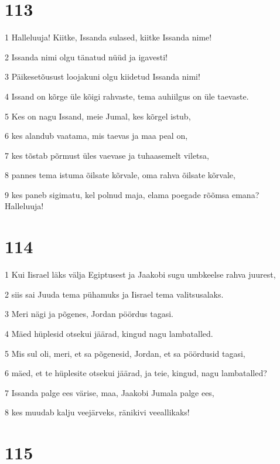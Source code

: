 \chapter{113}

\par 1 Halleluuja! Kiitke, Issanda sulased, kiitke Issanda nime!
\par 2 Issanda nimi olgu tänatud nüüd ja igavesti!
\par 3 Päikesetõusust loojakuni olgu kiidetud Issanda nimi!
\par 4 Issand on kõrge üle kõigi rahvaste, tema auhiilgus on üle taevaste.
\par 5 Kes on nagu Issand, meie Jumal, kes kõrgel istub,
\par 6 kes alandub vaatama, mis taevas ja maa peal on,
\par 7 kes tõstab põrmust üles vaevase ja tuhaasemelt viletsa,
\par 8 pannes tema istuma õilsate kõrvale, oma rahva õilsate kõrvale,
\par 9 kes paneb sigimatu, kel polnud maja, elama poegade rõõmsa emana? Halleluuja!

\chapter{114}

\par 1 Kui Iisrael läks välja Egiptusest ja Jaakobi sugu umbkeelse rahva juurest,
\par 2 siis sai Juuda tema pühamuks ja Iisrael tema valitsusalaks.
\par 3 Meri nägi ja põgenes, Jordan pöördus tagasi.
\par 4 Mäed hüplesid otsekui jäärad, kingud nagu lambatalled.
\par 5 Mis sul oli, meri, et sa põgenesid, Jordan, et sa pöördusid tagasi,
\par 6 mäed, et te hüplesite otsekui jäärad, ja teie, kingud, nagu lambatalled?
\par 7 Issanda palge ees värise, maa, Jaakobi Jumala palge ees,
\par 8 kes muudab kalju veejärveks, ränikivi veeallikaks!

\chapter{115}

